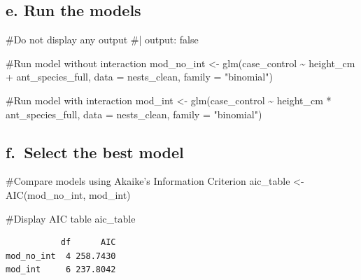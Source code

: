 \documentclass[
  letterpaper,
  DIV=11,
  numbers=noendperiod]{scrartcl}
\newenvironment{Shaded}{\begin{snugshade}}{\end{snugshade}}
\newcommand{\AttributeTok}[1]{\textcolor[rgb]{0.40,0.45,0.13}{#1}}
\newcommand{\CommentTok}[1]{\textcolor[rgb]{0.37,0.37,0.37}{#1}}
\newcommand{\FunctionTok}[1]{\textcolor[rgb]{0.28,0.35,0.67}{#1}}
\newcommand{\NormalTok}[1]{\textcolor[rgb]{0.00,0.23,0.31}{#1}}
\newcommand{\OtherTok}[1]{\textcolor[rgb]{0.00,0.23,0.31}{#1}}
\newcommand{\SpecialCharTok}[1]{\textcolor[rgb]{0.37,0.37,0.37}{#1}}
\newcommand{\StringTok}[1]{\textcolor[rgb]{0.13,0.47,0.30}{#1}}
\begin{document}
\subsection{\texorpdfstring{\textbf{e. Run the
models}}{e. Run the models}}\label{e.-run-the-models}

\begin{Shaded}
\begin{Highlighting}[]
\CommentTok{\#Do not display any output}
\CommentTok{\#| output: false}

\CommentTok{\#Run model without interaction}
\NormalTok{mod\_no\_int }\OtherTok{\textless{}{-}} \FunctionTok{glm}\NormalTok{(case\_control }\SpecialCharTok{\textasciitilde{}}\NormalTok{ height\_cm }\SpecialCharTok{+}\NormalTok{ ant\_species\_full,}
                  \AttributeTok{data =}\NormalTok{ nests\_clean,}
                  \AttributeTok{family =} \StringTok{"binomial"}\NormalTok{)}

\CommentTok{\#Run model with interaction}
\NormalTok{mod\_int }\OtherTok{\textless{}{-}} \FunctionTok{glm}\NormalTok{(case\_control }\SpecialCharTok{\textasciitilde{}}\NormalTok{ height\_cm }\SpecialCharTok{*}\NormalTok{ ant\_species\_full,}
               \AttributeTok{data =}\NormalTok{ nests\_clean,}
               \AttributeTok{family =} \StringTok{"binomial"}\NormalTok{)}
\end{Highlighting}
\end{Shaded}

\subsection{\texorpdfstring{\textbf{f.~Select the best
model}}{f.~Select the best model}}\label{f.-select-the-best-model}

\begin{Shaded}
\begin{Highlighting}[]
\CommentTok{\#Compare models using Akaike’s Information Criterion}
\NormalTok{aic\_table }\OtherTok{\textless{}{-}} \FunctionTok{AIC}\NormalTok{(mod\_no\_int,}
\NormalTok{                 mod\_int)}

\CommentTok{\#Display AIC table}
\NormalTok{aic\_table}
\end{Highlighting}
\end{Shaded}

\begin{verbatim}
           df      AIC
mod_no_int  4 258.7430
mod_int     6 237.8042
\end{verbatim}
\end{document}
